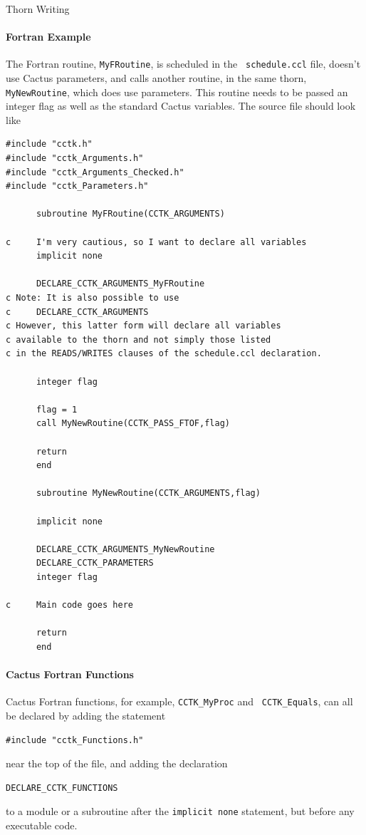 \begin{cactuspart}{Thorn Writing}
\paragraph{Fortran Example}

The Fortran routine, \verb|MyFRoutine|, is scheduled in the {\tt
schedule.ccl} file, doesn't use Cactus parameters, and calls another
routine, in the same thorn, \verb|MyNewRoutine|, which does use
parameters.  This routine needs to be passed an integer flag as well
as the standard Cactus variables. The source file should look like
%
\begin{verbatim}
#include "cctk.h"
#include "cctk_Arguments.h"
#include "cctk_Arguments_Checked.h"
#include "cctk_Parameters.h"

      subroutine MyFRoutine(CCTK_ARGUMENTS)

c     I'm very cautious, so I want to declare all variables
      implicit none

      DECLARE_CCTK_ARGUMENTS_MyFRoutine
c Note: It is also possible to use
c     DECLARE_CCTK_ARGUMENTS
c However, this latter form will declare all variables
c available to the thorn and not simply those listed
c in the READS/WRITES clauses of the schedule.ccl declaration.

      integer flag

      flag = 1
      call MyNewRoutine(CCTK_PASS_FTOF,flag)

      return
      end

      subroutine MyNewRoutine(CCTK_ARGUMENTS,flag)

      implicit none

      DECLARE_CCTK_ARGUMENTS_MyNewRoutine
      DECLARE_CCTK_PARAMETERS
      integer flag

c     Main code goes here

      return
      end

\end{verbatim}

\paragraph{Cactus Fortran Functions}

Cactus Fortran functions, for example, \texttt{CCTK\_MyProc} and {\tt
CCTK\_Equals}, can all be declared by adding the statement
%
\begin{verbatim}
#include "cctk_Functions.h"
\end{verbatim}
%
near the top of the file, and adding the declaration
%
\begin{verbatim}
DECLARE_CCTK_FUNCTIONS
\end{verbatim}
%
to a module or a subroutine after the \texttt{implicit none}
statement, but before any executable code.


\end{cactuspart}
